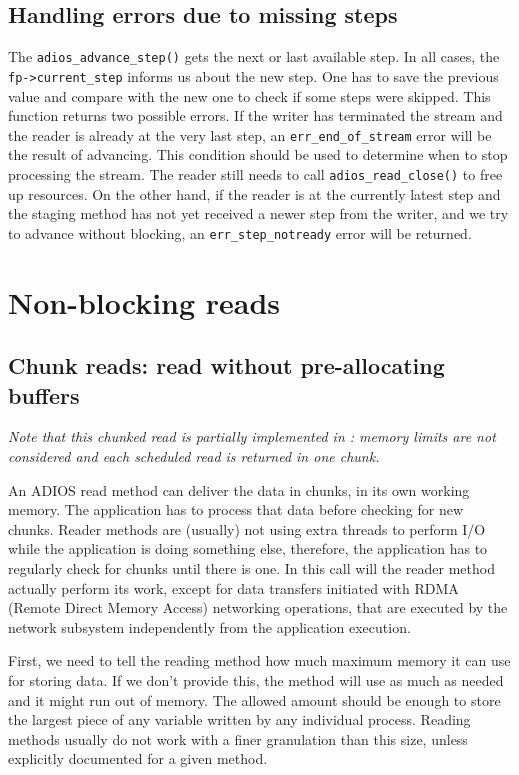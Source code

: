 \subsection{Handling errors due to missing steps}
The \verb+adios_advance_step()+ gets the next or last available step. In all cases, the \verb+fp->current_step+ informs us about the new step. One has to save the previous value and compare with the new one to check if some steps were skipped. This function returns two possible errors. If the writer has terminated the stream and the reader is already at the very last step, an \verb+err_end_of_stream+ error will be the result of advancing. This condition should be used to determine when to stop processing the stream. The reader still needs to call \verb+adios_read_close()+ to free up resources. On the other hand, if the reader is at the currently latest step and the staging method has not yet received a newer step from the writer, and we try to advance without blocking, an \verb+err_step_notready+ error will be returned.  




\section{Non-blocking reads}

\subsection{Chunk reads: read without pre-allocating buffers}
\emph{Note that this chunked read is partially implemented in \adiosversion: memory limits are not considered and each scheduled read is returned in one chunk.}

An ADIOS read method can deliver the data in chunks, in its own working memory. 
The application has to process that data before checking for new chunks. 
Reader methods are (usually) not using extra threads to perform I/O while 
the application is doing something else, therefore, the application has to 
regularly check for chunks until there is one. In this call will the reader 
method actually perform its work, except for data transfers initiated with 
RDMA (Remote Direct Memory Access) networking operations, that are executed 
by the network subsystem independently from the application execution. 

First, we need to tell the reading method how much maximum memory it can use for storing data. If we don't provide this, the method will use as much as needed and it might run out of memory. The allowed amount should be enough to store the largest piece of any variable written by any individual process. Reading methods usually do not work with a finer granulation than this size, unless explicitly documented for a given method. 

